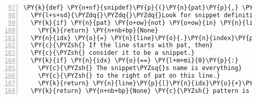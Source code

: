 \begin{Verbatim}[commandchars=\\\{\},numbers=left,numbersep=0.5em,firstnumber=97]
\PY{k}{def} \PY{n+nf}{snipdef}\PY{p}{(}\PY{n}{pat}\PY{p}{,} \PY{n}{line}\PY{p}{)}\PY{p}{:}
  \PY{l+s+sd}{\PYZdq{}\PYZdq{}\PYZdq{}Look for snippet definitions on a line.\PYZdq{}\PYZdq{}\PYZdq{}}
  \PY{k}{if} \PY{n}{pat} \PY{o+ow}{not} \PY{o+ow}{in} \PY{n}{line}\PY{p}{:}
    \PY{k}{return} \PY{n+nb+bp}{None}
  \PY{n}{idx} \PY{o}{=} \PY{n}{line}\PY{o}{.}\PY{n}{index}\PY{p}{(}\PY{n}{pat}\PY{p}{)}
  \PY{c}{\PYZsh{} If the line starts with pat, then}
  \PY{c}{\PYZsh{} consider it to be a snippet.}
  \PY{k}{if} \PY{n}{idx} \PY{o}{==} \PY{l+m+mi}{0}\PY{p}{:}
    \PY{c}{\PYZsh{} The snippet\PYZsq{}s name is everything}
    \PY{c}{\PYZsh{} to the right of pat on this line.}
    \PY{k}{return} \PY{n}{line}\PY{p}{[}\PY{n}{idx}\PY{o}{+}\PY{n+nb}{len}\PY{p}{(}\PY{n}{pat}\PY{p}{)}\PY{p}{:}\PY{p}{]}\PY{o}{.}\PY{n}{strip}\PY{p}{(}\PY{p}{)}
  \PY{k}{return} \PY{n+nb+bp}{None} \PY{c}{\PYZsh{} pattern is in line but not snippet}
\end{Verbatim}
